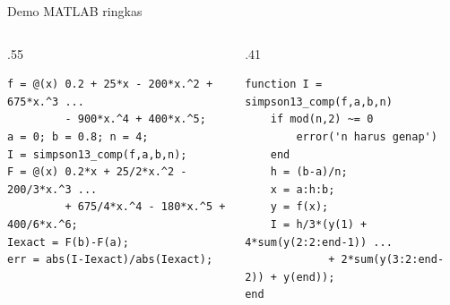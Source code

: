 \documentclass[aspectratio=169,10pt]{beamer}
\begin{document}
\begin{frame}[fragile]{Demo MATLAB ringkas}
\scriptsize
\begin{columns}[T,totalwidth=\textwidth]
\begin{column}{.55\textwidth}
\begin{bluebox}[Driver]
\begin{verbatim}
f = @(x) 0.2 + 25*x - 200*x.^2 + 675*x.^3 ...
         - 900*x.^4 + 400*x.^5;
a = 0; b = 0.8; n = 4;
I = simpson13_comp(f,a,b,n);
F = @(x) 0.2*x + 25/2*x.^2 - 200/3*x.^3 ...
         + 675/4*x.^4 - 180*x.^5 + 400/6*x.^6;
Iexact = F(b)-F(a);
err = abs(I-Iexact)/abs(Iexact);
\end{verbatim}
\end{bluebox}
\end{column}
\begin{column}{.41\textwidth}
\begin{orangebox}[Function]
\begin{verbatim}
function I = simpson13_comp(f,a,b,n)
    if mod(n,2) ~= 0
        error('n harus genap')
    end
    h = (b-a)/n;
    x = a:h:b;
    y = f(x);
    I = h/3*(y(1) + 4*sum(y(2:2:end-1)) ...
             + 2*sum(y(3:2:end-2)) + y(end));
end
\end{verbatim}
\end{orangebox}
\end{column}
\end{columns}
\end{frame}
\end{document}
